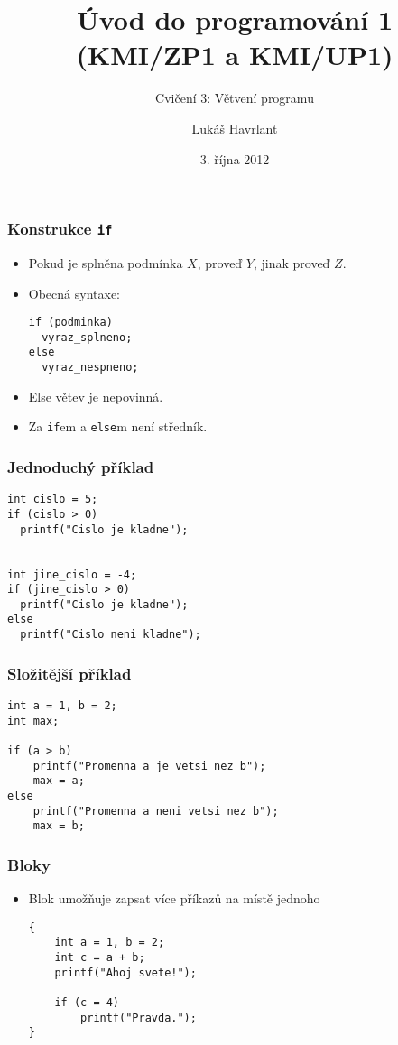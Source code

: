 \documentclass{beamer}
\title{Úvod do programování 1 (KMI/ZP1 a KMI/UP1)}
\subtitle{Cvičení 3: Větvení programu}
\author{Lukáš Havrlant}
\date{3. října 2012}
\institute{Univerzita Palackého}
\newenvironment{itemizex}%
  {\large \begin{itemize}%
    \setlength{\itemsep}{8pt}%
    \setlength{\parskip}{8pt}}%
  {\end{itemize}}
\begin{document}
\begin{frame}[t,plain]
\titlepage
\end{frame}



\begin{frame}[t,fragile]\frametitle{Konstrukce \texttt{if}} 
  \begin{itemizex}
    \item Pokud je splněna podmínka $X$, proveď $Y$, jinak proveď $Z$.
    \item Obecná syntaxe: 
    \begin{verbatim} 
if (podminka)
  vyraz_splneno;
else 
  vyraz_nespneno;
    \end{verbatim}
    \item Else větev je nepovinná.
    \item Za \texttt{if}em a \texttt{else}m není středník.
  \end{itemizex}
\end{frame}


\begin{frame}[t,fragile]\frametitle{Jednoduchý příklad} 
  \begin{verbatim} 
int cislo = 5;
if (cislo > 0)
  printf("Cislo je kladne");


int jine_cislo = -4;
if (jine_cislo > 0)
  printf("Cislo je kladne");
else
  printf("Cislo neni kladne");
  \end{verbatim}
\end{frame}



\begin{frame}[t,fragile]\frametitle{Složitější příklad} 
  \begin{verbatim} 
int a = 1, b = 2;
int max;

if (a > b) 
    printf("Promenna a je vetsi nez b");
    max = a;
else
    printf("Promenna a neni vetsi nez b");
    max = b;
  \end{verbatim}
\end{frame}


\begin{frame}[t,fragile]\frametitle{Bloky} 
  \begin{itemizex}
    \item Blok umožňuje zapsat více příkazů na místě jednoho
    \begin{verbatim} 
{
    int a = 1, b = 2;
    int c = a + b;
    printf("Ahoj svete!");

    if (c = 4)
        printf("Pravda.");
}
    \end{verbatim}
  \end{itemizex}
\end{frame}
\end{document}
